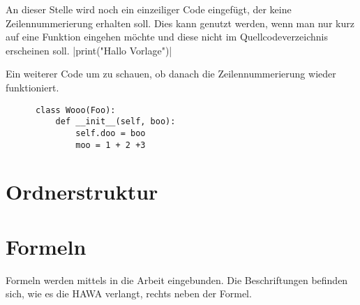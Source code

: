 An dieser Stelle wird noch ein einzeiliger Code eingefügt, der keine Zeilennummerierung erhalten soll.
Dies kann genutzt werden, wenn man nur kurz auf eine Funktion eingehen möchte und diese nicht im Quellcodeverzeichnis erscheinen soll.
|print("Hallo Vorlage")|

Ein weiterer Code um zu schauen, ob danach die Zeilennummerierung wieder funktioniert.

\begin{code}[hptb]
  \begin{verbatim}
      class Wooo(Foo):
          def __init__(self, boo):
              self.doo = boo
              moo = 1 + 2 +3
  \end{verbatim}
  \label{code:example2}
\end{code}
\section{Ordnerstruktur}

    \section{Formeln}
    Formeln werden mittels  in die Arbeit eingebunden.
    Die Beschriftungen befinden sich, wie es die HAWA verlangt, rechts neben der Formel.

